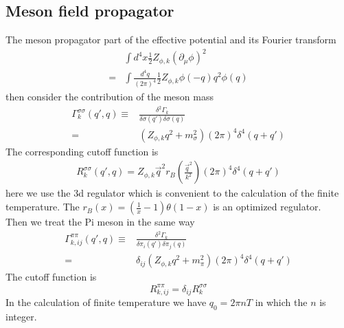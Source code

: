 \documentclass[UTF8]{article}
\begin{document}
\subsection{Meson field propagator}
The meson propagator part of the effective potential and its Fourier transform
\begin{equation}
\begin{split}
&\int d^4x \frac{1}{2}Z_{\phi,k}(\partial_\mu\phi)^2\\
=&\int\frac{d^4q}{(2\pi)^4}\frac{1}{2}Z_{\phi,k}\phi(-q)q^2\phi(q)
\end{split}
\end{equation}
then consider the contribution of the meson mass
\begin{equation}
\begin{split}
\Gamma^{\sigma\sigma}_{k}(q',q)\equiv&\frac{\delta^2\Gamma_k}
{\delta\sigma(q')\delta\sigma(q)}\\
=&(Z_{\phi,k}q^2+m^{2}_{\sigma})(2\pi)^4\delta^4(q+q')
\end{split}
\end{equation}
The corresponding cutoff function is
\begin{equation}
\begin{split}
R^{\sigma\sigma}_{k}(q',q)=Z_{\phi,k}\vec{q}^2r_B(\frac{\vec{q}^2}{k^2})(2\pi)^4\delta^4(q+q')
\end{split}
\end{equation}
here we use the 3d regulator which is convenient to the calculation of the finite temperature.
The $r_B(x)=(\frac{1}{x}-1)\theta(1-x)$ is an optimized regulator.\\
Then we treat the Pi meson in the same way
\begin{equation}
\begin{split}
\Gamma^{\pi\pi}_{k,ij}(q',q)\equiv&\frac{\delta^2\Gamma_k}
{\delta\pi_i(q')\delta\pi_j(q)}\\
=&\delta_{ij}(Z_{\phi,k}q^2+m^{2}_{\pi})(2\pi)^4\delta^4(q+q')
\end{split}
\end{equation}
The cutoff function is
\begin{equation}
R^{\pi\pi}_{k,ij}=\delta_{ij}R^{\sigma\sigma}_{k}
\end{equation}
In the calculation of finite temperature we have $q_0=2\pi nT$ in which the $n$ is integer.
\end{document}
